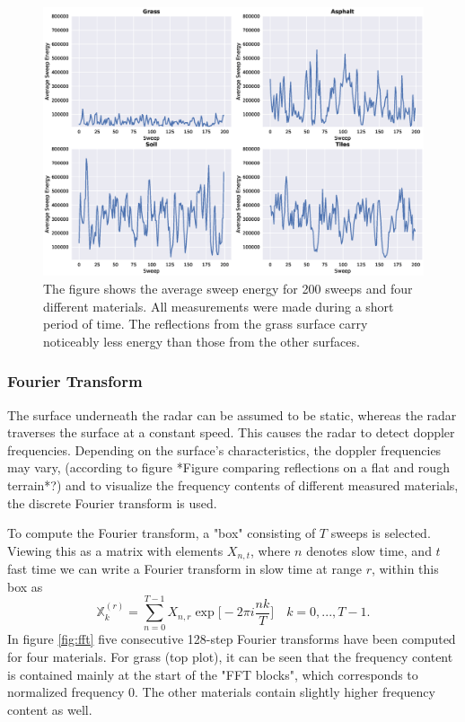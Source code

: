 \begin{figure}[h]
	\centering
	\includegraphics[scale=0.45]{figs_temp/features/sweep_energy}
	\caption{The figure shows the average sweep energy for 200 sweeps and four different materials. All measurements were made during a short period of time. The reflections from the grass surface carry noticeably less energy than those from the other surfaces. }
	\label{fig:sweep_energy}
\end{figure}



\subsubsection{Fourier Transform}
The surface underneath the radar can be assumed to be static, whereas the radar traverses the surface at a constant speed. This causes the radar to detect doppler frequencies. Depending on the surface's characteristics, the doppler frequencies may vary, (according to figure *Figure comparing reflections on a flat and rough terrain*?) and to visualize the frequency contents of different measured materials, the discrete Fourier transform is used. 

To compute the Fourier transform, a "box" consisting of $T$ sweeps is selected. Viewing this as a matrix with elements $X_{n,t}$, where $n$ denotes slow time, and $t$ fast time we can write a Fourier transform in slow time at range $r$, within this box as
\begin{equation}
	\mathbb{X}_k^{(r)} = \sum_{n=0}^{T-1}X_{n,r}\exp\Big[-2\pi i\frac{nk}{T}\Big] \quad k=0, ..., T-1.
\end{equation}
In figure \ref{fig:fft} five consecutive 128-step Fourier transforms have been computed for four materials. For grass (top plot), it can be seen that the frequency content is contained mainly at the start of the "FFT blocks", which corresponds to normalized frequency 0. The other materials contain slightly higher frequency content as well.

